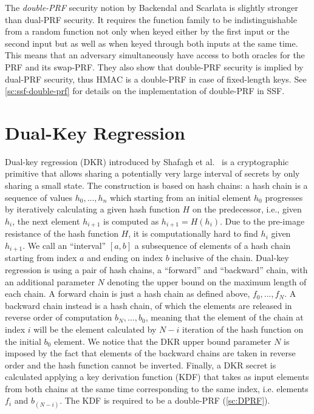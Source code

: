 The \textit{double-PRF} security notion by Backendal and Scarlata 
is slightly stronger than dual-PRF security.
It requires the function family to be indistinguishable from a random 
function not only when keyed either by the first input or the second input
but as well as when keyed through both inputs at the same time.
This means that an adversary simultaneously have access to both 
oracles for the PRF and its swap-PRF.
They also show that double-PRF security is implied by dual-PRF security,
thus HMAC is a double-PRF in case of fixed-length keys.
See \cref{sc:ssf-double-prf} for details on the implementation of double-PRF in SSF.

\section{Dual-Key Regression}\label{sc:DKR}

Dual-key regression (DKR) introduced by Shafagh et al.~\cite{USENIX:SBRH20} is a
cryptographic primitive that allows sharing a potentially very large interval 
of secrets by only sharing a small state.
The construction is based on hash chains: a hash chain is a sequence of values
$h_{0}, ..., h_{n}$ which starting from an initial
element $h_0$ progresses by iteratively calculating
a given hash function $H$ on the predecessor,
i.e., given $h_i$, the next element $h_{i+1}$ is computed as $h_{i+1} = H(h_i)$.
Due to the pre-image resistance of the hash function $H$, 
it is computationally hard to find $h_i$ given $h_{i+1}$.
We call an ``interval'' $[a, b]$ a subsequence of elements
of a hash chain starting from index $a$ and ending
on index $b$ inclusive of the chain.  
Dual-key regression is using a pair of hash chains,
a ``forward'' and ``backward'' chain, with an additional
parameter $N$ denoting the
upper bound on the maximum length of each chain.
A forward chain is just a hash chain as defined
above, $f_{0}, ..., f_{N}$.
A backward chain instead is a hash chain, of which the
elements are released in reverse order of computation
$b_{N}, ..., b_{0}$, meaning that the element of the chain 
at index $i$ will be the element calculated by $N - i$
iteration of the hash function on the initial $b_{0}$
element. We notice that the DKR upper bound parameter
$N$ is imposed by the
fact that elements of the backward chains are taken in
reverse order and the hash function cannot be inverted.
Finally, a DKR secret is calculated applying
a key derivation function (KDF) that takes
as input elements from both chains at the same
time corresponding to the same index, i.e.\!
elements $f_{i}$ and $b_{(N - i)}$.
The KDF is required to be a double-PRF (\cref{sc:DPRF}).

